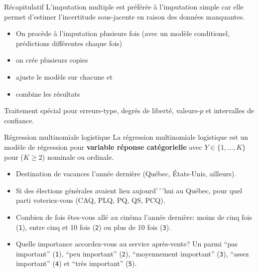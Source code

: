 \documentclass[
  ignorenonframetext,
]{beamer}
\providecommand{\tightlist}{%
  \setlength{\itemsep}{0pt}\setlength{\parskip}{0pt}}\usepackage{longtable,booktabs,array}
\begin{document}
\begin{frame}{Récapitulatif}
\label{ruxe9capitulatif-1}
L'imputation multiple est préférée à l'imputation simple car elle permet
d'estimer l'incertitude sous-jacente en raison des données manquantes.

\begin{itemize}
\tightlist
\item
  On procède à l'imputation plusieurs fois (avec un modèle conditionel,
  prédictions différentes chaque fois)
\item
  on crée plusieurs copies
\item
  ajuste le modèle sur chacune et
\item
  combine les résultats
\end{itemize}

Traitement spécial pour erreurs-type, degrés de liberté, valeurs-\(p\)
et intervalles de confiance.
\end{frame}

\begin{frame}[fragile]{Régression multinomiale logistique}
\label{ruxe9gression-multinomiale-logistique}
La régression multinomiale logistique est un modèle de régression pour
\textbf{variable réponse catégorielle} avec \(Y \in \{1, \ldots, K\}\)
pour (\(K \ge 2\)) nominale ou ordinale.

\small

\begin{itemize}
\tightlist
\item
  Destination de vacances l'année dernière (Québec, États-Unis,
  ailleurs).
\item
  Si des élections générales avaient lieu aujourd'\,'\,'hui au Québec,
  pour quel parti voteriez-vous (CAQ, PLQ, PQ, QS, PCQ).
\item
  Combien de fois êtes-vous allé au cinéma l'année dernière: moins de
  cinq fois (\texttt{1}), entre cinq et 10 fois (\texttt{2}) ou plus de
  10 fois (\texttt{3}).
\item
  Quelle importance accordez-vous au service après-vente? Un parmi ``pas
  important'' (\texttt{1}), ``peu important'' (\texttt{2}),
  ``moyennement important'' (\texttt{3}), ``assez important''
  (\texttt{4}) et ``très important'' (\texttt{5}).
\end{itemize}

\normalsize
\end{frame}
\end{document}
